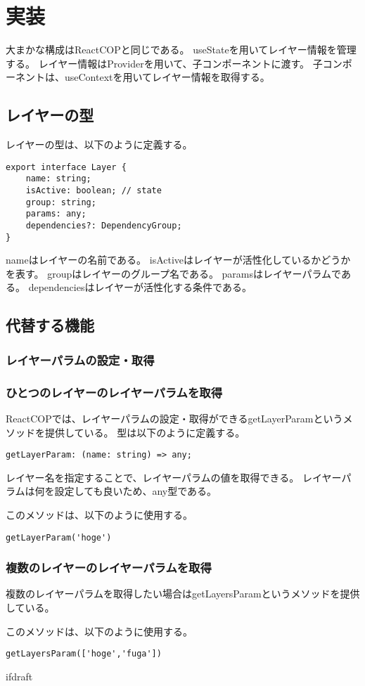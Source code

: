\documentclass{jsarticle}
\begin{document}
\fi
\section{実装}
大まかな構成はReactCOPと同じである。
useStateを用いてレイヤー情報を管理する。
レイヤー情報はProviderを用いて、子コンポーネントに渡す。
子コンポーネントは、useContextを用いてレイヤー情報を取得する。

\subsection{レイヤーの型}
レイヤーの型は、以下のように定義する。
\begin{lstlisting}[caption=レイヤーの型]
export interface Layer {
    name: string;
    isActive: boolean; // state
    group: string;
    params: any;
    dependencies?: DependencyGroup;
}
\end{lstlisting}
nameはレイヤーの名前である。
isActiveはレイヤーが活性化しているかどうかを表す。
groupはレイヤーのグループ名である。
paramsはレイヤーパラムである。
dependenciesはレイヤーが活性化する条件である。

\subsection{代替する機能}
\subsubsection{レイヤーパラムの設定・取得}
\subsubsection{ひとつのレイヤーのレイヤーパラムを取得}
ReactCOPでは、レイヤーパラムの設定・取得ができるgetLayerParamというメソッドを提供している。
型は以下のように定義する。
\begin{lstlisting}[caption=getLayerParamの型]
getLayerParam: (name: string) => any;
\end{lstlisting}
レイヤー名を指定することで、レイヤーパラムの値を取得できる。
レイヤーパラムは何を設定しても良いため、any型である。

このメソッドは、以下のように使用する。
\begin{lstlisting}[]
getLayerParam('hoge')
\end{lstlisting}

\subsubsection{複数のレイヤーのレイヤーパラムを取得}
複数のレイヤーパラムを取得したい場合はgetLayersParamというメソッドを提供している。

このメソッドは、以下のように使用する。
\begin{lstlisting}[]
getLayersParam(['hoge','fuga'])
\end{lstlisting}


\expandafter\ifx\csname ifdraft\endcsname\relax
\end{document}
